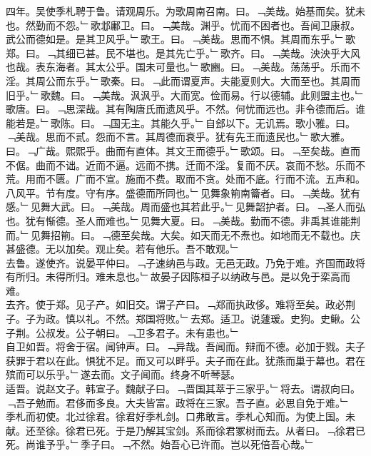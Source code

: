 \documentclass{zhvt-classic}
\begin{document}
\hspace*{2em}四年。吴使季札聘于鲁。请观周乐。为歌周南召南。曰。﹁美哉。始基而矣。犹未也。然勤而不怨。﹂歌邶鄘卫。曰。﹁美哉。渊乎。忧而不困者也。吾闻卫康叔。武公而德如是。是其卫风乎。﹂歌王。曰。﹁美哉。思而不惧。其周而东乎。﹂歌郑。曰。﹁其细已甚。民不堪也。是其先亡乎。﹂歌齐。曰。﹁美哉。泱泱乎大风也哉。表东海者。其太公乎。国未可量也。﹂歌豳。曰。﹁美哉。荡荡乎。乐而不淫。其周公而东乎。﹂歌秦。曰。﹁此而谓夏声。夫能夏则大。大而至也。其周而旧乎。﹂歌魏。曰。﹁美哉。沨沨乎。大而宽。俭而易。行以德辅。此则盟主也。﹂歌唐。曰。﹁思深哉。其有陶唐氏而遗风乎。不然。何忧而远也。非令德而后。谁能若是。﹂歌陈。曰。﹁国无主。其能久乎。﹂自郐以下。无讥焉。歌小雅。曰。﹁美哉。思而不贰。怨而不言。其周德而衰乎。犹有先王而遗民也。﹂歌大雅。曰。﹁广哉。熙熙乎。曲而有直体。其文王而德乎。﹂歌颂。曰。﹁至矣哉。直而不倨。曲而不诎。近而不逼。远而不携。迁而不淫。复而不厌。哀而不愁。乐而不荒。用而不匮。广而不宣。施而不费。取而不贪。处而不底。行而不流。五声和。八风平。节有度。守有序。盛德而所同也。﹂见舞象箾南籥者。曰。﹁美哉。犹有感。﹂见舞大武。曰。﹁美哉。周而盛也其若此乎。﹂见舞韶护者。曰。﹁圣人而弘也。犹有惭德。圣人而难也。﹂见舞大夏。曰。﹁美哉。勤而不德。非禹其谁能荆而。﹂见舞招箾。曰。﹁德至矣哉。大矣。如天而无不焘也。如地而无不载也。庆甚盛德。无以加矣。观止矣。若有他乐。吾不敢观。﹂\\
\hspace*{2em}去鲁。遂使齐。说晏平仲曰。﹁子速纳邑与政。无邑无政。乃免于难。齐国而政将有所归。未得所归。难未息也。﹂故晏子因陈桓子以纳政与邑。是以免于栾高而难。\\
\hspace*{2em}去齐。使于郑。见子产。如旧交。谓子产曰。﹁郑而执政侈。难将至矣。政必荆子。子为政。慎以礼。不然。郑国将败。﹂去郑。适卫。说蘧瑗。史狗。史鳅。公子荆。公叔发。公子朝曰。﹁卫多君子。未有患也。﹂\\
\hspace*{2em}自卫如晋。将舍于宿。闻钟声。曰。﹁异哉。吾闻而。辩而不德。必加于戮。夫子获罪于君以在此。惧犹不足。而又可以畔乎。夫子而在此。犹燕而巢于幕也。君在殡而可以乐乎。﹂遂去而。文子闻而。终身不听琴瑟。\\
\hspace*{2em}适晋。说赵文子。韩宣子。魏献子曰。﹁晋国其萃于三家乎。﹂将去。谓叔向曰。﹁吾子勉而。君侈而多良。大夫皆富。政将在三家。吾子直。必思自免于难。﹂\\
\hspace*{2em}季札而初使。北过徐君。徐君好季札剑。口弗敢言。季札心知而。为使上国。未献。还至徐。徐君已死。于是乃解其宝剑。系而徐君冢树而去。从者曰。﹁徐君已死。尚谁予乎。﹂季子曰。﹁不然。始吾心已许而。岂以死倍吾心哉。﹂\\
\end{document}
